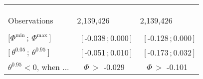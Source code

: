 \documentclass[11pt,oneside,reqno,xcolor=dvipsnames]{article} %
\begin{document}
\begin{appendix}
\begin{refsection}
\begin{landscape}
\begin{table}[!ht]
{\begin{threeparttable}
\begin{tabular}{|C{4cm}|C{5.8cm}C{5.8cm}|}
&& \\
&& \\[0.2cm] \hdashline
&& \\[-0.3cm]
Observations &  2,139,426        & 2,139,426      \\[0.1cm] \hdashline
&& \\[-0.2cm]
$\big[\Phi^{\text{min}}\,;\,\Phi^{\text{max}}\,\big] $& ~[\,-0.038\,;\,0.000\,] & ~[\,-0.128\,;\,0.000\,] \\[0.2cm]
$\big[\,\theta^{0.05}\,;\,\theta^{0.95} \,\big] $& ~[\,-0.051\,;\,0.010\,] & ~[\,-0.173\,;\,0.032\,] \\[0.2cm]
$\theta^{0.95}<0$, when ... & \,\,~$\Phi\,>\,\,$-0.029\hphantom{-} & \,\,~$\Phi\,>\,\,$-0.101\hphantom{-}  \\[0.2cm]  \hline \hline
\end{tabular}

\end{threeparttable}}
\end{table}
\end{landscape}
\end{refsection}
\end{appendix}
\end{document}
